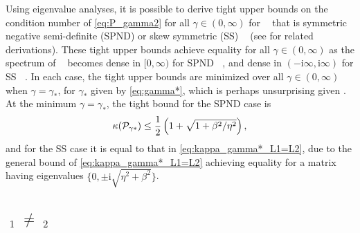 \documentclass[review]{siamart}
\newcommand{\tcb}{\textcolor{blue}}
\DeclareMathOperator{\cL}{\widehat{\mathcal{L}}}
\begin{document}
%
\begin{remark}
Using eigenvalue analyses, it is possible to derive tight upper bounds on the
condition number of \eqref{eq:P_gamma2} for all $\gamma \in (0, \infty)$ for
$\cL$ that is symmetric negative semi-definite (SPND) or skew symmetric (SS)
$\cL$ (see \cite{exh} for related derivations).
These tight upper bounds achieve equality for all $\gamma \in (0,
\infty)$ as the spectrum of $\cL$ becomes dense in $[0, \infty)$ for SPND
$\cL$, and dense in $(- \mathrm{i} \infty, \mathrm{i} \infty)$ for SS $\cL$. In each
case, the tight upper bounds are minimized over all $\gamma \in (0, \infty)$
when $\gamma = \gamma_*$, for $\gamma_*$ given by \eqref{eq:gamma*}, which is
perhaps unsurprising given . At the minimum $\gamma =
\gamma_*$, the tight bound for the SPND case is
\begin{align*}
\kappa({\cal P}_{\gamma*}) \leq \frac{1}{2} \left( 1 + \sqrt{1 + \beta^2/\eta^2} \right),
\end{align*}
and for the SS case it is equal to that in \eqref{eq:kappa_gamma*_L1=L2}, due
to the general bound  of \eqref{eq:kappa_gamma*_L1=L2} achieving equality for a
matrix $\cL$ having eigenvalues $\{0, \pm \mathrm{i} \sqrt{\eta^2 + \beta^2} \}$.
\end{remark}


\subsection{$\cL_1 \neq \cL_2$}\label{sec:theory:gen}
\end{document}
